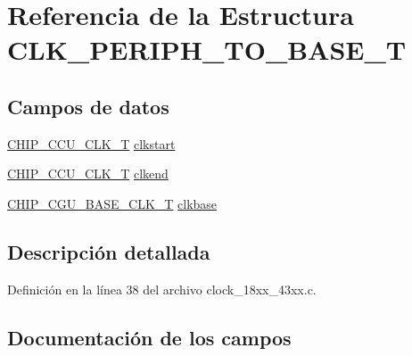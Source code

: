 \hypertarget{struct_c_l_k___p_e_r_i_p_h___t_o___b_a_s_e___t}{}\section{Referencia de la Estructura C\+L\+K\+\_\+\+P\+E\+R\+I\+P\+H\+\_\+\+T\+O\+\_\+\+B\+A\+S\+E\+\_\+T}
\label{struct_c_l_k___p_e_r_i_p_h___t_o___b_a_s_e___t}
\subsection*{Campos de datos}
\begin{DoxyCompactItemize}
\item 
\hyperlink{chip__clocks_8h_a45bb23228b9831321626c103ada7c60b}{C\+H\+I\+P\+\_\+\+C\+C\+U\+\_\+\+C\+L\+K\+\_\+T} \hyperlink{struct_c_l_k___p_e_r_i_p_h___t_o___b_a_s_e___t_a3bd5456974c499da03a33f0a2c6dba86}{clkstart}
\item 
\hyperlink{chip__clocks_8h_a45bb23228b9831321626c103ada7c60b}{C\+H\+I\+P\+\_\+\+C\+C\+U\+\_\+\+C\+L\+K\+\_\+T} \hyperlink{struct_c_l_k___p_e_r_i_p_h___t_o___b_a_s_e___t_a946dd64e2f5d1015b2d21a38d81e204f}{clkend}
\item 
\hyperlink{chip__clocks_8h_a31e266dd83cc66eb866d8d051ffd1d45}{C\+H\+I\+P\+\_\+\+C\+G\+U\+\_\+\+B\+A\+S\+E\+\_\+\+C\+L\+K\+\_\+T} \hyperlink{struct_c_l_k___p_e_r_i_p_h___t_o___b_a_s_e___t_a266104e1ff2be86743d22acd6df9b868}{clkbase}
\end{DoxyCompactItemize}


\subsection{Descripción detallada}


Definición en la línea 38 del archivo clock\+\_\+18xx\+\_\+43xx.\+c.



\subsection{Documentación de los campos}
